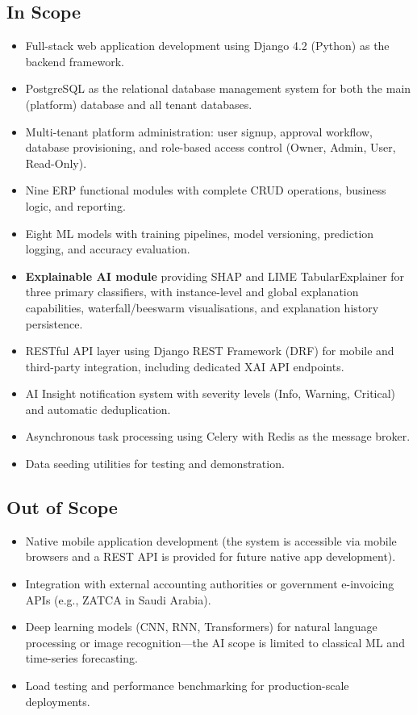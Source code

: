 \documentclass[12pt,a4paper]{report}
\begin{document}
\subsection{In Scope}
\begin{itemize}
  \item Full-stack web application development using Django 4.2 (Python) as the backend framework.
  \item PostgreSQL as the relational database management system for both the main (platform) database and all tenant databases.
  \item Multi-tenant platform administration: user signup, approval workflow, database provisioning, and role-based access control (Owner, Admin, User, Read-Only).
  \item Nine ERP functional modules with complete CRUD operations, business logic, and reporting.
  \item Eight ML models with training pipelines, model versioning, prediction logging, and accuracy evaluation.
  \item \textbf{Explainable AI module} providing SHAP and LIME TabularExplainer for three primary classifiers, with instance-level and global explanation capabilities, waterfall/beeswarm visualisations, and explanation history persistence.
  \item RESTful API layer using Django REST Framework (DRF) for mobile and third-party integration, including dedicated XAI API endpoints.
  \item AI Insight notification system with severity levels (Info, Warning, Critical) and automatic deduplication.
  \item Asynchronous task processing using Celery with Redis as the message broker.
  \item Data seeding utilities for testing and demonstration.
\end{itemize}

\subsection{Out of Scope}
\begin{itemize}
  \item Native mobile application development (the system is accessible via mobile browsers and a REST API is provided for future native app development).
  \item Integration with external accounting authorities or government e-invoicing APIs (e.g., ZATCA in Saudi Arabia).
  \item Deep learning models (CNN, RNN, Transformers) for natural language processing or image recognition---the AI scope is limited to classical ML and time-series forecasting.
  \item Load testing and performance benchmarking for production-scale deployments.
\end{itemize}
\end{document}
